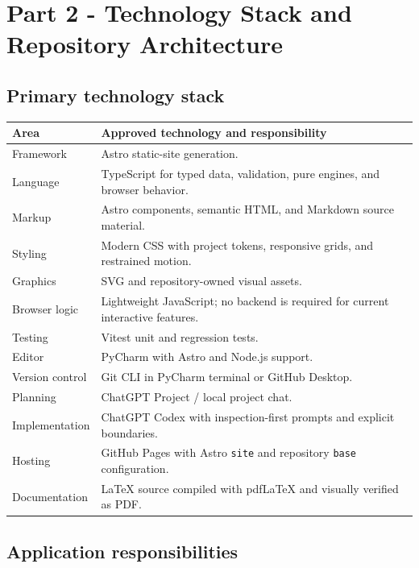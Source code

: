 \documentclass[11pt,letterpaper]{article}
\begin{document}
\section{Part 2 - Technology Stack and Repository Architecture}

\subsection{Primary technology stack}

\begin{tabularx}{\textwidth}{L{1.7in}Y}
\toprule
\textbf{Area} & \textbf{Approved technology and responsibility} \\
\midrule
Framework & Astro static-site generation. \\
Language & TypeScript for typed data, validation, pure engines, and browser behavior. \\
Markup & Astro components, semantic HTML, and Markdown source material. \\
Styling & Modern CSS with project tokens, responsive grids, and restrained motion. \\
Graphics & SVG and repository-owned visual assets. \\
Browser logic & Lightweight JavaScript; no backend is required for current interactive features. \\
Testing & Vitest unit and regression tests. \\
Editor & PyCharm with Astro and Node.js support. \\
Version control & Git CLI in PyCharm terminal or GitHub Desktop. \\
Planning & ChatGPT Project / local project chat. \\
Implementation & ChatGPT Codex with inspection-first prompts and explicit boundaries. \\
Hosting & GitHub Pages with Astro \texttt{site} and repository \texttt{base} configuration. \\
Documentation & LaTeX source compiled with pdfLaTeX and visually verified as PDF. \\
\bottomrule
\end{tabularx}

\subsection{Application responsibilities}
\end{document}
